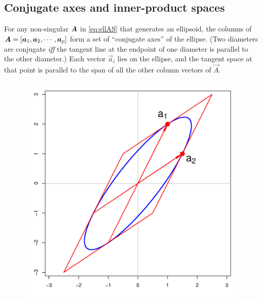 \subsection{Conjugate axes and inner-product spaces}\label{sec:conjugate}

For any non-singular $\bm{A}$ in \eqref{eq:ellAS} that generates an ellipsoid,  %
the columns of
$\bm{A}=\left[
   \bm{a}_{1}, \bm{a}_{2}, \cdots, \bm{a}_{p}  \\
\right]
$
form a set of ``conjugate axes'' of the ellipse. (Two diameters are conjugate \emph{iff}
the tangent line at the endpoint of one diameter is parallel to the other diameter.)
Each vector
$\vec{a}_{i}$
lies on the ellipse, and the tangent space at that point is parallel to the span of all the other column vectors of
$\vec{A}$.
\begin{figure}[htb]
 \begin{minipage}[b]{.49\linewidth}
  \centering
  \includegraphics[width=1\linewidth]{fig/conjugate1}
 \end{minipage}%
 \hfill
 \begin{minipage}[b]{.49\linewidth}
  \centering

\end{minipage}
\end{figure}
